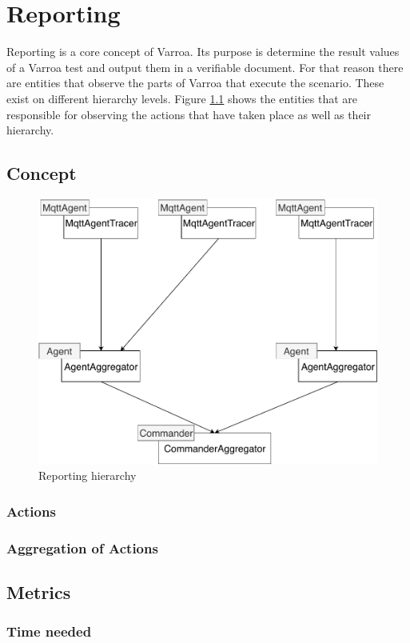 \chapter{Reporting}
Reporting is a core concept of Varroa.
Its purpose is determine the result values of a Varroa test and output them in a verifiable document.
For that reason there are entities that observe the parts of Varroa that execute the scenario.
These exist on different hierarchy levels.
Figure \ref{fig:ReportMapping} shows the entities that are responsible for observing the actions that have taken place as well as their hierarchy.

\section{Concept}
\begin{figure}[H]
	\begin{center}
		\includegraphics[scale=0.8]{Resources/PDF/ReportMapping}
		\caption{Reporting hierarchy}
		\label{fig:ReportMapping}
	\end{center}
\end{figure}




\subsection{Actions}

\subsection{Aggregation of Actions}

\section{Metrics}

\subsection{Time needed}



